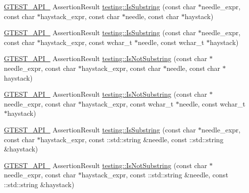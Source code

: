 \begin{DoxyCompactItemize}
\mbox{\hyperlink{_obj__test_2lib_2googletest-release-1_88_81_2googletest_2include_2gtest_2internal_2gtest-port_8h_aa73be6f0ba4a7456180a94904ce17790}{G\+T\+E\+S\+T\+\_\+\+A\+P\+I\+\_\+}} Assertion\+Result \mbox{\hyperlink{namespacetesting_a390c4f66fe7e9098117eb77e5fffa4ad}{testing\+::\+Is\+Substring}} (const char $\ast$needle\+\_\+expr, const char $\ast$haystack\+\_\+expr, const char $\ast$needle, const char $\ast$haystack)
\item 
\mbox{\hyperlink{_obj__test_2lib_2googletest-release-1_88_81_2googletest_2include_2gtest_2internal_2gtest-port_8h_aa73be6f0ba4a7456180a94904ce17790}{G\+T\+E\+S\+T\+\_\+\+A\+P\+I\+\_\+}} Assertion\+Result \mbox{\hyperlink{namespacetesting_aa1c82529c7591d2a9fd016de45dd9113}{testing\+::\+Is\+Substring}} (const char $\ast$needle\+\_\+expr, const char $\ast$haystack\+\_\+expr, const wchar\+\_\+t $\ast$needle, const wchar\+\_\+t $\ast$haystack)
\item 
\mbox{\hyperlink{_obj__test_2lib_2googletest-release-1_88_81_2googletest_2include_2gtest_2internal_2gtest-port_8h_aa73be6f0ba4a7456180a94904ce17790}{G\+T\+E\+S\+T\+\_\+\+A\+P\+I\+\_\+}} Assertion\+Result \mbox{\hyperlink{namespacetesting_a2288dcf4249f88af67dcd46544dc49a6}{testing\+::\+Is\+Not\+Substring}} (const char $\ast$needle\+\_\+expr, const char $\ast$haystack\+\_\+expr, const char $\ast$needle, const char $\ast$haystack)
\item 
\mbox{\hyperlink{_obj__test_2lib_2googletest-release-1_88_81_2googletest_2include_2gtest_2internal_2gtest-port_8h_aa73be6f0ba4a7456180a94904ce17790}{G\+T\+E\+S\+T\+\_\+\+A\+P\+I\+\_\+}} Assertion\+Result \mbox{\hyperlink{namespacetesting_a53e5c6e91ea429c43de7f4f57e33d166}{testing\+::\+Is\+Not\+Substring}} (const char $\ast$needle\+\_\+expr, const char $\ast$haystack\+\_\+expr, const wchar\+\_\+t $\ast$needle, const wchar\+\_\+t $\ast$haystack)
\item 
\mbox{\hyperlink{_obj__test_2lib_2googletest-release-1_88_81_2googletest_2include_2gtest_2internal_2gtest-port_8h_aa73be6f0ba4a7456180a94904ce17790}{G\+T\+E\+S\+T\+\_\+\+A\+P\+I\+\_\+}} Assertion\+Result \mbox{\hyperlink{namespacetesting_a571c7edcfc574269833ebe3e7d338ec5}{testing\+::\+Is\+Substring}} (const char $\ast$needle\+\_\+expr, const char $\ast$haystack\+\_\+expr, const \+::std\+::string \&needle, const \+::std\+::string \&haystack)
\item 
\mbox{\hyperlink{_obj__test_2lib_2googletest-release-1_88_81_2googletest_2include_2gtest_2internal_2gtest-port_8h_aa73be6f0ba4a7456180a94904ce17790}{G\+T\+E\+S\+T\+\_\+\+A\+P\+I\+\_\+}} Assertion\+Result \mbox{\hyperlink{namespacetesting_abe7b3fa1c9528745f934d4a14155ea87}{testing\+::\+Is\+Not\+Substring}} (const char $\ast$needle\+\_\+expr, const char $\ast$haystack\+\_\+expr, const \+::std\+::string \&needle, const \+::std\+::string \&haystack)

\end{DoxyCompactItemize}
